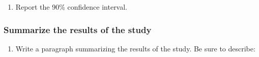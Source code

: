 \documentclass[
]{report}
\providecommand{\tightlist}{%
  \setlength{\itemsep}{0pt}\setlength{\parskip}{0pt}}
\begin{document}
\begin{enumerate}
\def\labelenumi{\arabic{enumi}.}
\setcounter{enumi}{6}
\tightlist
\item
  Report the 90\% confidence interval.
\end{enumerate}

\vspace{0.2in}

\subsubsection*{Summarize the results of the study}\label{summarize-the-results-of-the-study}

\begin{enumerate}
\def\labelenumi{\arabic{enumi}.}
\setcounter{enumi}{7}
\tightlist
\item
  Write a paragraph summarizing the results of the study. Be sure to describe:
\end{enumerate}
\end{document}
